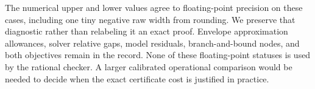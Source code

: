 The numerical upper and lower values agree to floating-point precision on these cases, including one tiny negative raw width from rounding. We preserve that diagnostic rather than relabeling it an exact proof. Envelope approximation allowances, solver relative gaps, model residuals, branch-and-bound nodes, and both objectives remain in the record. None of these floating-point statuses is used by the rational checker. A larger calibrated operational comparison would be needed to decide when the exact certificate cost is justified in practice.
